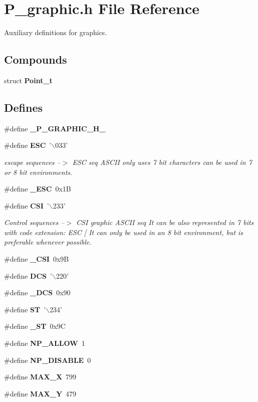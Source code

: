 \section{P\_\-graphic.h File Reference}
\label{P__graphic_8h}
Auxiliary definitions for graphics. 


\subsection*{Compounds}
\begin{CompactItemize}
\item 
struct {\bf Point\_\-t}
\end{CompactItemize}
\subsection*{Defines}
\begin{CompactItemize}
\item 
\#define {\bf \_\-P\_\-GRAPHIC\_\-H\_\-}
\item 
\#define {\bf ESC}\ '$\backslash$033'
\begin{CompactList}\small\item\em escape sequences --$>$ ESC seq ASCII only uses 7 bit characters can be used in 7 or 8 bit environments.\item\end{CompactList}\item 
\#define {\bf \_\-ESC}\ 0x1B
\item 
\#define {\bf CSI}\ '$\backslash$233'
\begin{CompactList}\small\item\em Control sequences --$>$ CSI graphic ASCII seq It can be also represented in 7 bits with code extension: ESC [ It can only be used in an 8 bit environment, but is preferable whenever possible.\item\end{CompactList}\item 
\#define {\bf \_\-CSI}\ 0x9B
\item 
\#define {\bf DCS}\ '$\backslash$220'
\item 
\#define {\bf \_\-DCS}\ 0x90
\item 
\#define {\bf ST}\ '$\backslash$234'
\item 
\#define {\bf \_\-ST}\ 0x9C
\item 
\#define {\bf NP\_\-ALLOW}\ 1
\item 
\#define {\bf NP\_\-DISABLE}\ 0
\item 
\#define {\bf MAX\_\-X}\ 799
\item 
\#define {\bf MAX\_\-Y}\ 479
\end{CompactItemize}
